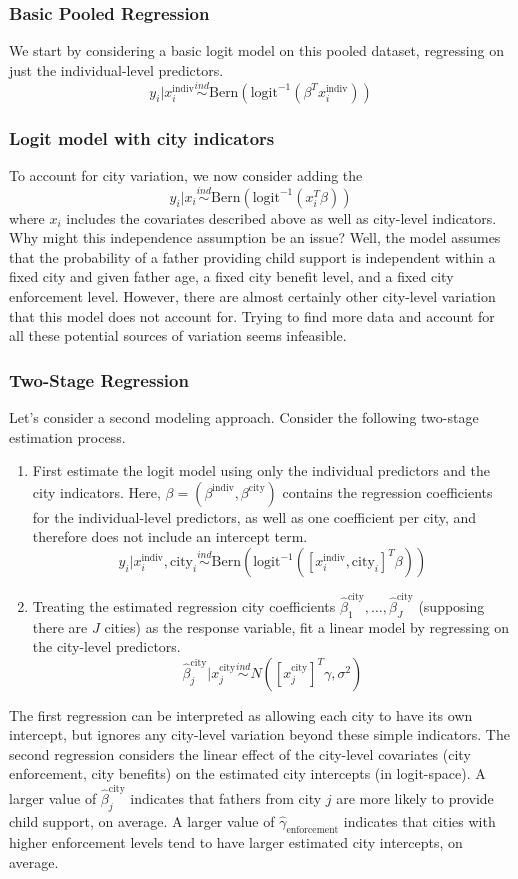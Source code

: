 \documentclass[12pt]{article}
\begin{document}
\subsubsection{Basic Pooled Regression}
We start by considering a basic logit model on this pooled dataset, regressing on just the individual-level predictors. 
\[y_i|x_i^{\text{indiv}} \overset{ind}{\sim} \text{Bern}(\text{logit}^{-1}(\beta^T x_i^{\text{indiv}})) \]

\subsubsection{Logit model with city indicators}
To account for city variation, we now consider adding the 
\[y_i|x_i \overset{ind}{\sim} \text{Bern}(\text{logit}^{-1}(x_i^T \beta)) \]
where $x_i$ includes the covariates described above as well as city-level indicators. Why might this independence assumption be an issue? Well, the model assumes that the probability of a father providing 
child support is independent within a fixed city and given father age, a fixed city benefit level, and a fixed city enforcement level. However, there are almost certainly other city-level variation that this model 
does not account for. Trying to find more data and account for all these potential sources of variation seems infeasible. 

\subsubsection{Two-Stage Regression}
Let's consider a second modeling approach. Consider the following two-stage estimation process. 
\begin{enumerate}
\item First estimate the logit model using only the individual predictors and the city indicators. Here, $\beta = (\beta^{\text{indiv}}, \beta^{\text{city}})$ contains the regression coefficients for the individual-level 
predictors, as well as one coefficient per city, and therefore does not include an intercept term. 
\[y_i|x_i^{\text{indiv}}, \text{city}_i \overset{ind}{\sim} \text{Bern}(\text{logit}^{-1}([x_i^{\text{indiv}}, \text{city}_i]^T \beta)) \]
\item Treating the estimated regression city coefficients $\hat{\beta}^{\text{city}}_1, \dots, \hat{\beta}^{\text{city}}_J$ (supposing there are $J$ cities) as the response variable, fit a linear model by regressing on the 
city-level predictors. 
\[\hat{\beta}^{\text{city}}_j|x_j^{\text{city}} \overset{ind}{\sim} N([x_j^{\text{city}}]^T \gamma, \sigma^2)\]
\end{enumerate}
The first regression can be interpreted as allowing each city to have its own intercept, but ignores any city-level variation beyond these simple indicators. The second regression considers the linear effect of 
the city-level covariates (city enforcement, city benefits) on the estimated city intercepts (in logit-space). A larger value of $\hat{\beta}^{\text{city}}_j$ indicates that fathers from city $j$ are more likely to provide child support, on average. A larger value of $\hat{\gamma}_{\text{enforcement}}$ indicates that cities with higher enforcement levels tend to have larger estimated city intercepts, on average. 
\end{document}
